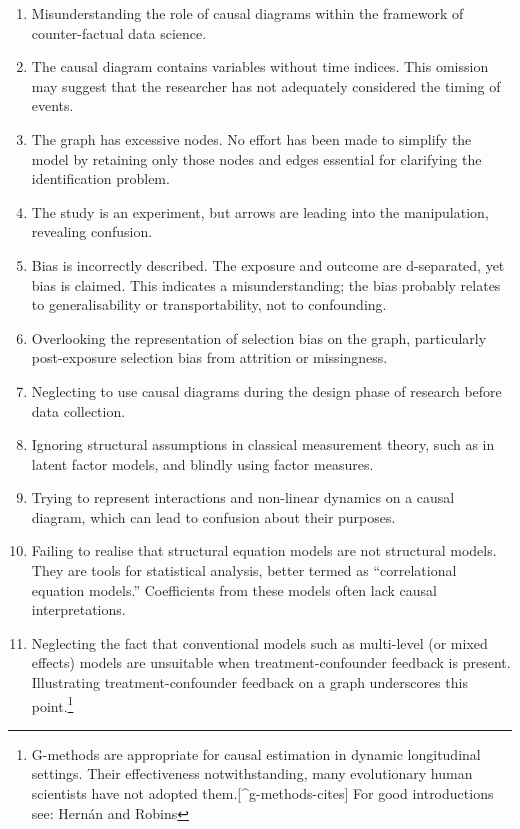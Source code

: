 \documentclass[
  singlecolumn]{article}
\begin{document}
\begin{enumerate}
\def\labelenumi{\arabic{enumi}.}
\item
  Misunderstanding the role of causal diagrams within the framework of
  counter-factual data science.
\item
  The causal diagram contains variables without time indices. This
  omission may suggest that the researcher has not adequately considered
  the timing of events.
\item
  The graph has excessive nodes. No effort has been made to simplify the
  model by retaining only those nodes and edges essential for clarifying
  the identification problem.
\item
  The study is an experiment, but arrows are leading into the
  manipulation, revealing confusion.
\item
  Bias is incorrectly described. The exposure and outcome are
  d-separated, yet bias is claimed. This indicates a misunderstanding;
  the bias probably relates to generalisability or transportability, not
  to confounding.
\item
  Overlooking the representation of selection bias on the graph,
  particularly post-exposure selection bias from attrition or
  missingness.
\item
  Neglecting to use causal diagrams during the design phase of research
  before data collection.
\item
  Ignoring structural assumptions in classical measurement theory, such
  as in latent factor models, and blindly using factor measures.
\item
  Trying to represent interactions and non-linear dynamics on a causal
  diagram, which can lead to confusion about their purposes.
\item
  Failing to realise that structural equation models are not structural
  models. They are tools for statistical analysis, better termed as
  ``correlational equation models.'' Coefficients from these models
  often lack causal interpretations.
\item
  Neglecting the fact that conventional models such as multi-level (or
  mixed effects) models are unsuitable when treatment-confounder
  feedback is present. Illustrating treatment-confounder feedback on a
  graph underscores this point.\footnote{G-methods are appropriate for
    causal estimation in dynamic longitudinal settings. Their
    effectiveness notwithstanding, many evolutionary human scientists
    have not adopted them.{[}\^{}g-methods-cites{]} For good
    introductions see: Hernán and Robins
}
\end{enumerate}
\end{document}
